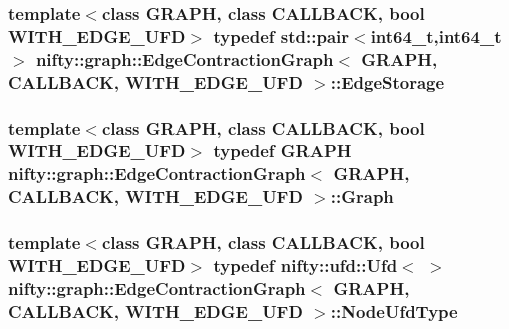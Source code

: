 \subsubsection[{Edge\+Storage}]{\setlength{\rightskip}{0pt plus 5cm}template$<$class G\+R\+A\+P\+H, class C\+A\+L\+L\+B\+A\+C\+K, bool W\+I\+T\+H\+\_\+\+E\+D\+G\+E\+\_\+\+U\+F\+D$>$ typedef std\+::pair$<$int64\+\_\+t,int64\+\_\+t$>$ {\bf nifty\+::graph\+::\+Edge\+Contraction\+Graph}$<$ G\+R\+A\+P\+H, C\+A\+L\+L\+B\+A\+C\+K, W\+I\+T\+H\+\_\+\+E\+D\+G\+E\+\_\+\+U\+F\+D $>$\+::{\bf Edge\+Storage}}\label{classnifty_1_1graph_1_1EdgeContractionGraph_ad57e807f7df20892c7bbbb9b53d3aa08}
\hypertarget{classnifty_1_1graph_1_1EdgeContractionGraph_a22f00237e657f393dfcaacdc10de9bba}{}
\subsubsection[{Graph}]{\setlength{\rightskip}{0pt plus 5cm}template$<$class G\+R\+A\+P\+H, class C\+A\+L\+L\+B\+A\+C\+K, bool W\+I\+T\+H\+\_\+\+E\+D\+G\+E\+\_\+\+U\+F\+D$>$ typedef G\+R\+A\+P\+H {\bf nifty\+::graph\+::\+Edge\+Contraction\+Graph}$<$ G\+R\+A\+P\+H, C\+A\+L\+L\+B\+A\+C\+K, W\+I\+T\+H\+\_\+\+E\+D\+G\+E\+\_\+\+U\+F\+D $>$\+::{\bf Graph}}\label{classnifty_1_1graph_1_1EdgeContractionGraph_a22f00237e657f393dfcaacdc10de9bba}
\hypertarget{classnifty_1_1graph_1_1EdgeContractionGraph_a7ff98238621f4b534e89b1880ee77239}{}
\subsubsection[{Node\+Ufd\+Type}]{\setlength{\rightskip}{0pt plus 5cm}template$<$class G\+R\+A\+P\+H, class C\+A\+L\+L\+B\+A\+C\+K, bool W\+I\+T\+H\+\_\+\+E\+D\+G\+E\+\_\+\+U\+F\+D$>$ typedef {\bf nifty\+::ufd\+::\+Ufd}$<$ $>$ {\bf nifty\+::graph\+::\+Edge\+Contraction\+Graph}$<$ G\+R\+A\+P\+H, C\+A\+L\+L\+B\+A\+C\+K, W\+I\+T\+H\+\_\+\+E\+D\+G\+E\+\_\+\+U\+F\+D $>$\+::{\bf Node\+Ufd\+Type}}\label{classnifty_1_1graph_1_1EdgeContractionGraph_a7ff98238621f4b534e89b1880ee77239}
\hypertarget{classnifty_1_1graph_1_1EdgeContractionGraph_a9b33be5b2975fe298604326c10df1f93}{}
